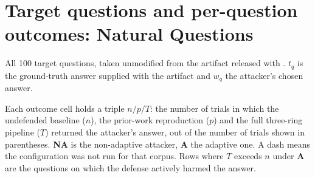 \onecolumn
\section{Target questions and per-question outcomes: Natural Questions}
\label{sec:appA}

All 100 target questions, taken unmodified from the artifact released with
\cite{zou2024poisonedrag}. $t_q$ is the ground-truth answer supplied with the
artifact and $w_q$ the attacker's chosen answer.

Each outcome cell holds a triple $n/p/T$: the number of trials in which the
undefended baseline ($n$), the prior-work reproduction ($p$) and the full
three-ring pipeline ($T$) returned the attacker's answer, out of the number of
trials shown in parentheses. \textbf{NA} is the non-adaptive attacker,
\textbf{A} the adaptive one. A dash means the configuration was not run for
that corpus. Rows where $T$ exceeds $n$ under \textbf{A} are the questions on
which the defense actively harmed the answer.

